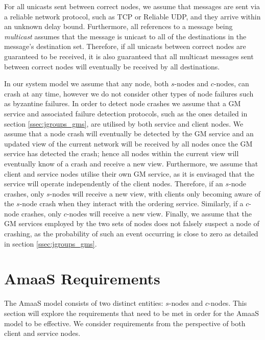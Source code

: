     For all unicasts sent between correct nodes, we assume that messages are sent via a reliable network protocol, such as TCP\citep{Cerf:2005:PPN:1064413.1064423} or Reliable UDP\citep{ReliableUDP}, and they arrive within an unknown delay bound.   Furthermore, all references to a message being \emph{multicast} assumes that the message is unicast to all of the destinations in the message's destination set.  Therefore, if all unicasts between correct nodes are guaranteed to be received, it is also guaranteed that all multicast messages sent between correct nodes will eventually be received by all destinations.  
		
    In our system model we assume that any node, both $s$-nodes and $c$-nodes, can crash at any time, however we do not consider other types of node failures such as byzantine failures.  In order to detect node crashes we assume that a GM service and associated failure detection protocols, such as the ones detailed in section \ref{ssec:jgroups_gms}, are utilised by both service and client nodes.  We assume that a node crash will eventually be detected by the GM service and an updated view of the current network will be received by all nodes once the GM service has detected the crash; hence all nodes within the current view will eventually know of a crash and receive a new view.  Furthermore, we assume that client and service nodes utilise their own GM service, as it is envisaged that the service will operate independently of the client nodes.  Therefore, if an $s$-node crashes, only $s$-nodes will receive a new view, with clients only becoming aware of the $s$-node crash when they interact with the ordering service.  Similarly, if a $c$-node crashes, only $c$-nodes will receive a new view.  Finally, we assume that the GM services employed by the two sets of nodes does not falsely suspect a node of crashing, as the probability of such an event occurring is close to zero as detailed in section \ref{ssec:jgroups_gms}.  
    
	
\section{AmaaS Requirements}\label{sec:absaas_requirements}
The \textsf{AmaaS} model consists of two distinct entities: $s$-nodes and $c$-nodes.  This section will explore the requirements that need to be met in order for the \textsf{AmaaS} model to be effective.  We consider requirements from the perspective of both client and service nodes.

